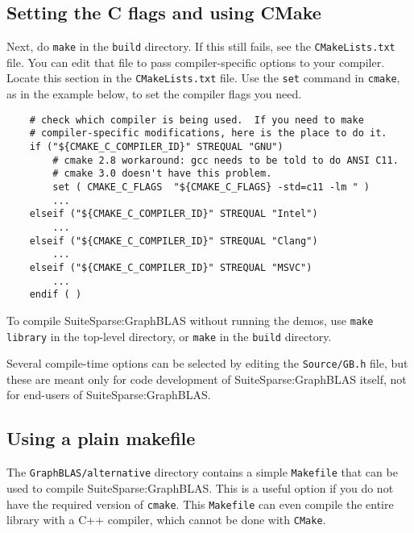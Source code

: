 \documentclass[12pt]{article}
\begin{document}
{\subsection{Setting the C flags and using CMake}

Next, do \verb'make' in the \verb'build' directory.  If this still fails, see
the \verb'CMakeLists.txt' file.  You can edit that file to pass
compiler-specific options to your compiler.  Locate this section in the
\verb'CMakeLists.txt' file.  Use the \verb'set' command in \verb'cmake', as in
the example below, to set the compiler flags you need.

    {\small
    \begin{verbatim}
    # check which compiler is being used.  If you need to make
    # compiler-specific modifications, here is the place to do it.
    if ("${CMAKE_C_COMPILER_ID}" STREQUAL "GNU")
        # cmake 2.8 workaround: gcc needs to be told to do ANSI C11.
        # cmake 3.0 doesn't have this problem.
        set ( CMAKE_C_FLAGS  "${CMAKE_C_FLAGS} -std=c11 -lm " )
        ...
    elseif ("${CMAKE_C_COMPILER_ID}" STREQUAL "Intel")
        ...
    elseif ("${CMAKE_C_COMPILER_ID}" STREQUAL "Clang")
        ...
    elseif ("${CMAKE_C_COMPILER_ID}" STREQUAL "MSVC")
        ...
    endif ( )
    \end{verbatim} }

To compile SuiteSparse:GraphBLAS without running the demos, use \newline
\verb'make library' in the top-level directory, or \verb'make' in the
\verb'build' directory.

Several compile-time options can be selected by editing the \verb'Source/GB.h'
file, but these are meant only for code development of SuiteSparse:GraphBLAS
itself, not for end-users of SuiteSparse:GraphBLAS.

\subsection{Using a plain makefile}
\label{altmake}

The \verb'GraphBLAS/alternative' directory contains a simple \verb'Makefile'
that can be used to compile SuiteSparse:GraphBLAS.  This is a useful option
if you do not have the required version of \verb'cmake'.  This \verb'Makefile'
can even compile the entire library with a C++ compiler, which cannot be
done with \verb'CMake'.

}
\end{document}
